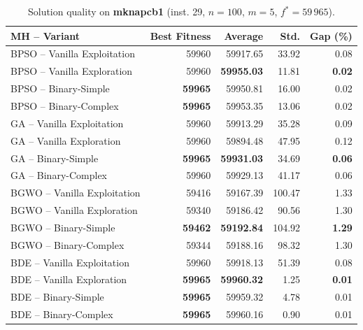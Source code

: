 \begin{table}[htbp]
  \centering
  \small
  \caption{Solution quality on \textbf{mknapcb1} (inst. 29, $n=100$, $m=5$, $f^*=59\,965$).}
  \label{tab:calidad_mknapcb1_29}
  \begin{tabular}{lrrrr}
    \toprule
    \textbf{MH -- Variant} &
    \textbf{Best Fitness} &
    \textbf{Average} &
    \textbf{Std.} &
    \textbf{Gap (\%)} \\
    \midrule
    BPSO -- Vanilla Exploitation &          59960 &         59917.65 &  33.92 &         0.08 \\
    BPSO -- Vanilla Exploration  &          59960 & \textbf{59955.03} &  11.81 & \textbf{0.02} \\
    BPSO -- Binary-Simple        & \textbf{59965} &         59950.81 &  16.00 &         0.02 \\
    BPSO -- Binary-Complex       & \textbf{59965} &         59953.35 &  13.06 &         0.02 \\
    \midrule
    GA -- Vanilla Exploitation   &          59960 &         59913.29 &  35.28 &         0.09 \\
    GA -- Vanilla Exploration    &          59960 &         59894.48 &  47.95 &         0.12 \\
    GA -- Binary-Simple          & \textbf{59965} & \textbf{59931.03} &  34.69 & \textbf{0.06} \\
    GA -- Binary-Complex         &          59960 &         59929.13 &  41.17 &         0.06 \\
    \midrule
    BGWO -- Vanilla Exploitation &          59416 &         59167.39 & 100.47 &         1.33 \\
    BGWO -- Vanilla Exploration  &          59340 &         59186.42 &  90.56 &         1.30 \\
    BGWO -- Binary-Simple        & \textbf{59462} & \textbf{59192.84} & 104.92 & \textbf{1.29} \\
    BGWO -- Binary-Complex       &          59344 &         59188.16 &  98.32 &         1.30 \\
    \midrule
    BDE -- Vanilla Exploitation  &          59960 &         59918.13 &  51.39 &         0.08 \\
    BDE -- Vanilla Exploration   & \textbf{59965} & \textbf{59960.32} &   1.25 & \textbf{0.01} \\
    BDE -- Binary-Simple         & \textbf{59965} &         59959.32 &   4.78 &         0.01 \\
    BDE -- Binary-Complex        & \textbf{59965} &         59960.16 &   0.90 &         0.01 \\
    \bottomrule
  \end{tabular}
\end{table}
